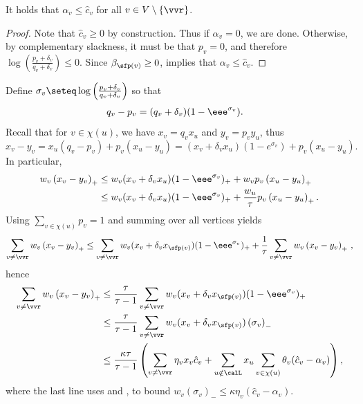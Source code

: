 \begin{lemma}\label{lem:alphas}
	It holds that $\alpha_v \leq \hat{c}_v$ for all $v \in V \setminus \{\vvr\}$.
\end{lemma}

\begin{proof}
	Note that $\hat{c}_v \geq 0$ by construction.  Thus if $\alpha_v = 0$, we are done.
	Otherwise, by complementary slackness, it must be that $p_v = 0$, and therefore
	$\log(\frac{p_v+\delta_v}{q_v+\delta_v}) \leq 0$.  Since $\beta_{\sfp(v)} \geq 0$,  implies that
	$\alpha_v \leq \hat{c}_v$.
\end{proof}

Define
$\sigma_v \seteq \log \left(\frac{p_v+\delta_v}{q_v+\delta_v}\right)$
so that
\begin{align}
q_v - p_v &= (q_v + \delta_v) (1-\eee^{\sigma_v}). \label{eq:qp}
\end{align}
Recall that for $v \in \chi(u)$, we have $x_v = q_v x_u$ and $y_v = p_v y_u$, thus
\[
x_v - y_v = x_u (q_v - p_v) + p_v (x_u - y_u) = (x_v+\delta_v x_u) (1-e^{\sigma_v}) + p_v (x_u - y_u).
\]
In particular,
\begin{align*}
w_v \left(x_v-y_v\right)_+ &\leq w_v (x_v+\delta_v x_u) (1-\eee^{\sigma_v})_+ + w_v p_v \left(x_u-y_u\right)_+ \\
&\leq w_v (x_v+\delta_v x_u) (1-\eee^{\sigma_v})_+ + \frac{w_u}{\tau} p_v \left(x_u-y_u\right)_+.
\end{align*}
Using $\sum_{v \in \chi(u)} p_v = 1$ and
summing over all vertices yields
\[
\sum_{v \neq \vvr} w_v \left(x_v-y_v\right)_+ \leq \sum_{v \neq \vvr} w_v (x_v+\delta_v x_{\sfp(v)}) (1-\eee^{\sigma_v})_{+} + \frac{1}{\tau} \sum_{v \neq \vvr} w_v \left(x_v-y_v\right)_+\,,
\]
hence
\begin{align}
\sum_{v \neq \vvr} w_v \left(x_v-y_v\right)_+ &\leq \frac{\tau}{\tau-1} \sum_{v \neq \vvr} w_v (x_v+\delta_v x_{\sfp(v)}) (1-\eee^{\sigma_v})_+ \nonumber \\ 
&\leq \frac{\tau}{\tau-1} \sum_{v \neq \vvr} w_v (x_v+\delta_v x_{\sfp(v)}) \left(\sigma_v\right)_{-} \nonumber \\
&\leq\frac{\kappa \tau}{\tau-1} \left(\sum_{v \neq \vvr} \eta_v x_v \hat{c}_v + \sum_{u \notin \calL} x_u \sum_{v \in \chi(u)} \theta_v (\hat{c}_v-\alpha_v)\right),
\label{eq:mvmt0}
\end{align}
where the last line uses
 and , to bound
$w_v (\sigma_v)_{-} \leq \kappa \eta_v\left(\hat{c}_v - \alpha_v\right)$.

